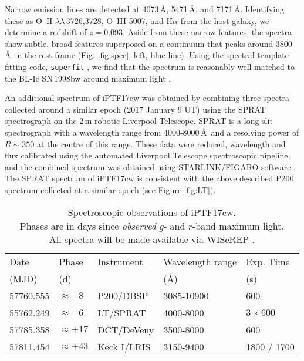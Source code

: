 \documentclass[twocolumn]{emulateapj}
\begin{document}
Narrow emission lines are detected at 4073\,\AA, 5471\,\AA, and
7171\,\AA. Identifying these as O~II $\lambda\lambda$\,3726,3728, O~III
5007, and H$\alpha$ from the host galaxy, we determine a redshift of
$z=0.093$. Aside from these narrow features, the spectra show
subtle, broad features superposed on a continuum that peaks around
3800\,\AA\ in the rest frame (Fig. \ref{fig:spec}, left, blue line). Using the spectral template fitting
code, {\tt superfit} \citep{howell2006}, we find that the spectrum is
reasonably well matched to the BL-Ic SN\,1998bw around maximum light \citep[Fig. \ref{fig:spec}, right; see also][]{Iwamoto1998}.

An additional spectrum of iPTF17cw  was obtained by combining three spectra collected around a similar epoch (2017 January 9 UT) using the 
SPRAT spectrograph \citep{SPRAT} on the 2\,m robotic Liverpool Telescope. SPRAT is a 
long slit spectrograph with a wavelength range from 4000-8000\,\AA\, and a resolving power of $R\sim 350$ 
at the centre of this range. These data were reduced, wavelength and flux calibrated using the automated 
Liverpool Telescope spectroscopic pipeline, and the combined spectrum was obtained using STARLINK/FIGARO software \citep{Currie2014}. The SPRAT spectrum of iPTF17cw is consistent with the above described P200 spectrum collected at a similar epoch (see Figure \ref{fig:LT}).

\begin{center}
\begin{longtable}{lllll}
\caption{Spectroscopic observations of iPTF17cw. \\Phases are in days since \textit{observed} $g$- and $r$-band maximum light. \\All spectra will be made available via  WISeREP \citep{Yaron2012}.  \label{tab:optspec}}
\\
\hline
\hline
Date & Phase & Instrument & Wavelength range & Exp. Time \\
(MJD) & (d) &  & (\AA)& (s) \\ 
\hline
\endhead
57760.555 & $\approx -8$ &P200/DBSP &  3085-10900 & 600 \\
55762.249 & $\approx -6$ & LT/SPRAT & 4000-8000 & $3\times600$\\
57785.358 & $\approx +17$ &DCT/DeVeny &  3500-8000 & 600 \\
57811.454 &  $\approx +43$ &  Keck I/LRIS & 3150-9400 & 1800 / 1700\\
\hline
\end{longtable}
\end{center}
\end{document}
